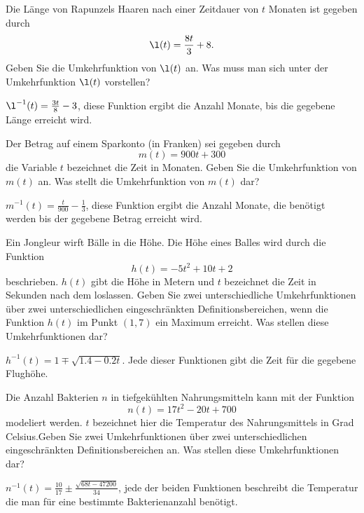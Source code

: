\begin{exercises}

\begin{exercise}
Die Länge von Rapunzels Haaren nach einer Zeitdauer von $t$ Monaten ist gegeben durch
\[
\l(t) = \frac{8t}{3}+8.
\]
Geben Sie die Umkehrfunktion von $\l(t)$ an.  Was muss man sich unter der Umkehrfunktion $\l(t)$
 vorstellen?
\begin{answer}
$\l^{-1}(t) = \frac{3t}{8} - 3$, diese Funktion ergibt die Anzahl Monate, bis die gegebene Länge erreicht wird.
\end{answer}
\end{exercise}

\begin{exercise}
Der Betrag auf einem Sparkonto (in Franken) sei gegeben durch
\[
m(t) = 900t + 300
\]
die Variable $t$ bezeichnet die Zeit in Monaten. Geben Sie die Umkehrfunktion von $m(t)$ an.  Was stellt die Umkehrfunktion von $m(t)$ dar?
\begin{answer}
$m^{-1}(t) = \frac{t}{900} - \frac{1}{3}$, diese Funktion ergibt die Anzahl Monate, die benötigt werden bis der gegebene Betrag erreicht wird.
\end{answer}
\end{exercise}

\begin{exercise}
Ein Jongleur wirft Bälle in die Höhe. Die Höhe eines Balles wird durch die Funktion
\[
h(t) = -5t^2+10t+2
\]
beschrieben. $h(t)$ gibt die Höhe in Metern und $t$ bezeichnet die Zeit in Sekunden nach dem loslassen. Geben Sie zwei unterschiedliche Umkehrfunktionen über zwei unterschiedlichen eingeschränkten Definitionsbereichen, wenn die Funktion $h(t)$ im Punkt $(1,7)$ ein Maximum erreicht. Was stellen diese Umkehrfunktionen dar?
\begin{answer}
$h^{-1}(t) = 1 \mp \sqrt{1.4-0.2t}$.  Jede dieser Funktionen gibt die Zeit für die gegebene Flughöhe.
\end{answer}
\end{exercise}

\begin{exercise}
Die Anzahl Bakterien $n$ in tiefgekühlten Nahrungsmitteln kann mit der Funktion
\[
n(t) =17t^2 - 20t + 700
\]
modeliert werden. $t$ bezeichnet hier die Temperatur des Nahrungsmittels in Grad Celsius.Geben Sie zwei Umkehrfunktionen über zwei unterschiedlichen eingeschränkten Definitionsbereichen an. Was stellen diese Umkehrfunktionen dar?
\begin{answer}
$n^{-1}(t)= \frac{10}{17} \pm \frac{\sqrt{68t-47200}}{34}$, jede der beiden Funktionen beschreibt die Temperatur die man für eine bestimmte Bakterienanzahl benötigt.
\end{answer}
\end{exercise}



\end{exercises}
